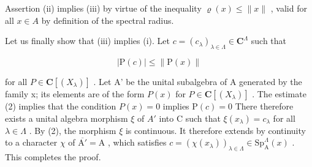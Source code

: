 Assertion (ii) implies (iii) by virtue of the inequality \(\varrho(x) \leqslant \|x\|\) , valid for all \(x \in A\) by definition of the spectral radius.

Let us finally show that (iii) implies (i). Let \(c = (c_{\lambda})_{\lambda \in \Lambda} \in \mathbf{C}^{\Lambda}\) such that

\[
| \mathrm{P} (c) | \leqslant \| \mathrm{P} (x) \|\tag{2}
\]

for all \(P \in \mathbf{C}[(X_{\lambda})]\) . Let A' be the unital subalgebra of A generated by the family x; its elements are of the form \(P(x)\) for \(P \in \mathbf{C}[(X_{\lambda})]\) . The estimate (2) implies that the condition \(P(x) = 0\) implies \(\mathrm{P}(c)=0\) There therefore exists a unital algebra morphism \(\xi\) of \(A'\) into C such that \(\xi(x_{\lambda})=c_{\lambda}\) for all \(\lambda\in\Lambda\) . By (2), the morphism \(\xi\) is continuous. It therefore extends by continuity to a character \(\chi\) of \(\overline{\mathrm{A}'}=\mathrm{A}\) , which satisfies \(c=(\chi(x_{\lambda}))_{\lambda\in\Lambda}\in\mathrm{Sp}_{\mathrm{A}}^{\Lambda}(x)\) . This completes the proof.

